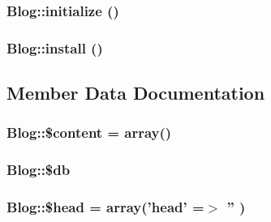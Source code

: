 \hypertarget{classBlog_34c4a536cfa1342b35c0dc3215d7f0ba}{
\subsubsection[{initialize}]{\setlength{\rightskip}{0pt plus 5cm}Blog::initialize ()}}
\label{classBlog_34c4a536cfa1342b35c0dc3215d7f0ba}


\hypertarget{classBlog_1977c12b27f8729e078d08439814e293}{
\subsubsection[{install}]{\setlength{\rightskip}{0pt plus 5cm}Blog::install ()}}
\label{classBlog_1977c12b27f8729e078d08439814e293}




\subsection{Member Data Documentation}
\hypertarget{classBlog_1b4cf0388b49fb47b9f048a888003172}{
\subsubsection[{\$content}]{\setlength{\rightskip}{0pt plus 5cm}Blog::\$content = array()}}
\label{classBlog_1b4cf0388b49fb47b9f048a888003172}


\hypertarget{classBlog_bdac60715ec7077cef7ae3647394b769}{
\subsubsection[{\$db}]{\setlength{\rightskip}{0pt plus 5cm}Blog::\$db}}
\label{classBlog_bdac60715ec7077cef7ae3647394b769}


\hypertarget{classBlog_d7904d5d75bba12e8c9449b6a692e598}{
\subsubsection[{\$head}]{\setlength{\rightskip}{0pt plus 5cm}Blog::\$head = array('head' =$>$ '' )}}
\label{classBlog_d7904d5d75bba12e8c9449b6a692e598}


